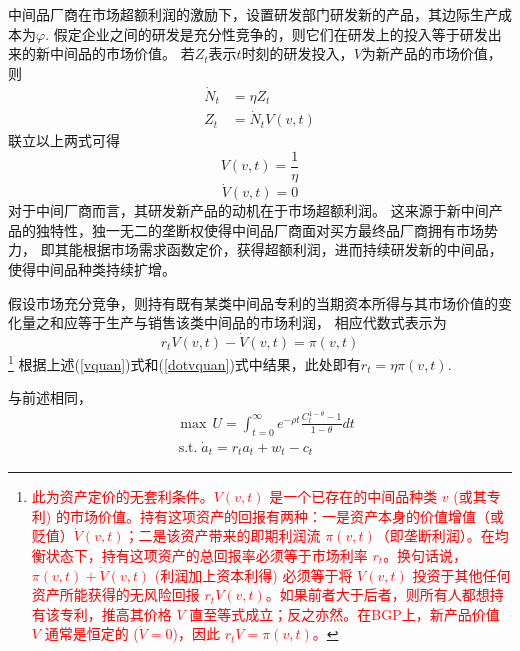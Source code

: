 \documentclass[cn,normal,11pt,black]{elegantnote}
\begin{document}
\begin{definition}[中间品厂商]  
    中间品厂商在市场超额利润的激励下，设置研发部门研发新的产品，其边际生产成本为$\varphi$.
    假定企业之间的研发是充分性竞争的，则它们在研发上的投入等于研发出来的新中间品的市场价值。
    若$Z_t$表示$t$时刻的研发投入，$V$为新产品的市场价值，则
    \begin{align}
       \dot{N}_t & = \eta Z_t \\
        Z_t & = \dot{N}_t V(v,t)
    \end{align}
    联立以上两式可得
    \begin{equation}\label{vquan}
       V(v,t) = \frac{1}{\eta} 
    \end{equation}
    \begin{equation}\label{dotvquan}
       \dot{V}(v,t) = 0 
    \end{equation}
    对于中间厂商而言，其研发新产品的动机在于市场超额利润。
    这来源于新中间产品的独特性，独一无二的垄断权使得中间品厂商面对买方最终品厂商拥有市场势力，
    即其能根据市场需求函数定价，获得超额利润，进而持续研发新的中间品，使得中间品种类持续扩增。
\end{definition}

\begin{definition}[市场无套利条件]
    假设市场充分竞争，则持有既有某类中间品专利的当期资本所得与其市场价值的变化量之和应等于生产与销售该类中间品的市场利润，
    相应代数式表示为
    \begin{equation}\label{noprofitquan}
      r_t V(v,t) - \dot{V}(v,t) = \pi(v,t)  
    \end{equation}\footnote{\textcolor{red}{此为资产定价的无套利条件。$V(v,t)$ 是一个已存在的中间品种类 $v$ (或其专利) 的市场价值。持有这项资产的回报有两种：一是资产本身的价值增值（或贬值）$\dot{V}(v,t)$；二是该资产带来的即期利润流 $\pi(v,t)$（即垄断利润）。在均衡状态下，持有这项资产的总回报率必须等于市场利率 $r_t$。换句话说，$\pi(v,t) + \dot{V}(v,t)$ (利润加上资本利得) 必须等于将 $V(v,t)$ 投资于其他任何资产所能获得的无风险回报 $r_t V(v,t)$。如果前者大于后者，则所有人都想持有该专利，推高其价格 $V$ 直至等式成立；反之亦然。在BGP上，新产品价值 $V$ 通常是恒定的 ($\dot{V}=0$)，因此 $r_t V = \pi(v,t)$。}}
    根据上述(\ref{vquan})式和(\ref{dotvquan})式中结果，此处即有$r_t = \eta \pi(v,t)$.
\end{definition}

\begin{definition}[个人效用函数]
    与前述相同，
    \begin{align}
        & \max \, U  = \int_{t=0}^{\infty} e^{-\rho t} \frac{C_t^{1-\theta} -1}{1-\theta} dt \\
        & \, \mathrm{s.t.} \; \dot{a}_t =  r_t a_t + w_t - c_t
    \end{align}
\end{definition}
\end{document}
